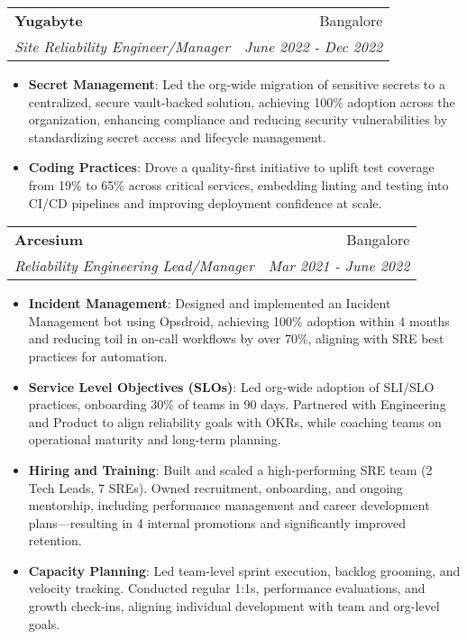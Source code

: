\documentclass[letterpaper,11pt]{article}
\makeatletter
\newcommand{\resumeItem}[2]{
  \item\small{
    \textbf{#1}{: #2 \vspace{-2pt}}
  }
}
\newcommand{\resumeSubheading}[4]{
  \vspace{-1pt}\item
    \begin{tabular*}{0.97\textwidth}{l@{\extracolsep{\fill}}r}
      \textbf{#1} & #2 \\
      \textit{\small#3} & \textit{\small #4} \\
    \end{tabular*}\vspace{-5pt}
}
\newcommand{\resumeItemListStart}{\begin{itemize}}
\newcommand{\resumeItemListEnd}{\end{itemize}\vspace{-5pt}}
\makeatother
\begin{document}
    \resumeSubheading
      {Yugabyte}{Bangalore}
      {Site Reliability Engineer/Manager}{June 2022 - Dec 2022}
      \resumeItemListStart
        \resumeItem{Secret Management}
          {Led the org-wide migration of sensitive secrets to a centralized, secure vault-backed solution, achieving 100\% adoption across the organization, enhancing compliance and reducing security vulnerabilities by standardizing secret access and lifecycle management.}
        \resumeItem{Coding Practices}
          {Drove a quality-first initiative to uplift test coverage from 19\% to 65\% across critical services, embedding linting and testing into CI/CD pipelines and improving deployment confidence at scale.}
      \resumeItemListEnd

    \resumeSubheading
      {Arcesium}{Bangalore}
      {Reliability Engineering Lead/Manager}{Mar 2021 - June 2022}
      \resumeItemListStart
        \resumeItem{Incident Management}
          {Designed and implemented an Incident Management bot using Opsdroid, achieving 100\% adoption within 4 months and reducing toil in on-call workflows by over 70\%, aligning with SRE best practices for automation.}
        \resumeItem{Service Level Objectives (SLOs)}
          {Led org-wide adoption of SLI/SLO practices, onboarding 30\% of teams in 90 days. Partnered with Engineering and Product to align reliability goals with OKRs, while coaching teams on operational maturity and long-term planning.}
        \resumeItem{Hiring and Training}
          {Built and scaled a high-performing SRE team (2 Tech Leads, 7 SREs). Owned recruitment, onboarding, and ongoing mentorship, including performance management and career development plans—resulting in 4 internal promotions and significantly improved retention.}
        \resumeItem{Capacity Planning}
          {Led team-level sprint execution, backlog grooming, and velocity tracking. Conducted regular 1:1s, performance evaluations, and growth check-ins, aligning individual development with team and org-level goals.}
      \resumeItemListEnd
\end{document}
